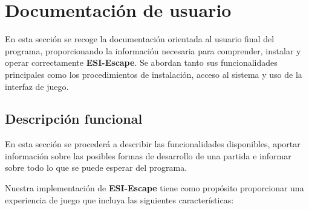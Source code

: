 

\section{Documentación de usuario}

En esta sección se recoge la documentación orientada al usuario final del programa, proporcionando 
la información necesaria para comprender, instalar y operar correctamente \textbf{ESI-Escape}. Se abordan 
tanto sus funcionalidades principales como los procedimientos de instalación, 
acceso al sistema y uso de la interfaz de juego.

\subsection{Descripción funcional}

En esta sección se procederá a describir las funcionalidades disponibles, aportar 
información sobre las posibles formas de desarrollo de una partida e informar sobre 
todo lo que se puede esperar del programa.

\bigskip

Nuestra implementación de \textbf{ESI-Escape} tiene como propósito proporcionar 
una experiencia de juego que incluya las siguientes características:

